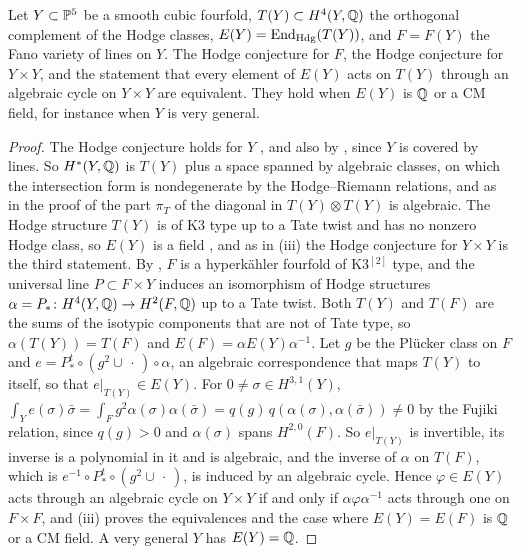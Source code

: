 \begin{corollary}
\label{cor:fanolines}
Let $Y\subset\mathbb{P}^{5}$ be a smooth cubic fourfold, $T(Y)\subset
H^{4}(Y,\mathbb{Q})$ the orthogonal complement of the Hodge classes,
$E(Y)=\operatorname{End}_{\mathrm{Hdg}}(T(Y))$, and $F=F(Y)$ the Fano variety of lines on
$Y$. The Hodge conjecture for $F$, the Hodge conjecture for $Y\times Y$, and
the statement that every element of $E(Y)$ acts on $T(Y)$ through an
algebraic cycle on $Y\times Y$ are equivalent. They hold when $E(Y)$ is $\mathbb{Q}$
or a CM field, for instance when $Y$ is very general.
\end{corollary}

\begin{proof}
The Hodge conjecture holds for $Y$ \cite{Zuc77}, and also by
, since $Y$ is covered by lines. So $H^{*}(Y,\mathbb{Q})$
is $T(Y)$ plus a space spanned by algebraic classes, on which the intersection
form is nondegenerate by the Hodge--Riemann relations, and as in the proof of
 the part $\pi_{T}$ of the diagonal in
$T(Y)\otimes T(Y)$ is algebraic. The Hodge structure $T(Y)$ is of K3 type up
to a Tate twist and has no nonzero Hodge class, so $E(Y)$ is a field
\cite{Zar83}, and as in (iii) the Hodge conjecture for
$Y\times Y$ is the third statement. By \cite{BD85}, $F$ is a hyperk\"ahler
fourfold of K3$^{[2]}$ type, and the universal line $P\subset F\times Y$
induces an isomorphism of Hodge structures $\alpha=P_{*}\colon
H^{4}(Y,\mathbb{Q})\to H^{2}(F,\mathbb{Q})$ up to a Tate twist. Both $T(Y)$ and $T(F)$
are the sums of the isotypic components that are not of Tate type, so
$\alpha(T(Y))=T(F)$ and $E(F)=\alpha E(Y)\alpha^{-1}$. Let $g$ be the
Pl\"ucker class on $F$ and $e=P^{t}_{*}\circ(g^{2}\cup\,\cdot\,)
\circ\alpha$, an algebraic correspondence that maps $T(Y)$ to itself, so that
$e|_{T(Y)}\in E(Y)$. For $0\ne\sigma\in H^{3,1}(Y)$,
$\int_{Y}e(\sigma)\bar\sigma=\int_{F}g^{2}\alpha(\sigma)\alpha(\bar\sigma)
=q(g)\,q(\alpha(\sigma),\alpha(\bar\sigma))\ne0$ by the Fujiki relation, since
$q(g)>0$ and $\alpha(\sigma)$ spans $H^{2,0}(F)$. So $e|_{T(Y)}$ is
invertible, its inverse is a polynomial in it and is algebraic, and the
inverse of $\alpha$ on $T(F)$,
which is $e^{-1}\circ P^{t}_{*}\circ(g^{2}\cup\,\cdot\,)$, is induced by an
algebraic cycle. Hence $\varphi\in E(Y)$ acts through an algebraic cycle on
$Y\times Y$ if and only if $\alpha\varphi\alpha^{-1}$ acts through one on
$F\times F$, and (iii) proves the equivalences and the
case where $E(Y)=E(F)$ is $\mathbb{Q}$ or a CM field. A very general $Y$ has
$E(Y)=\mathbb{Q}$.
\end{proof}

